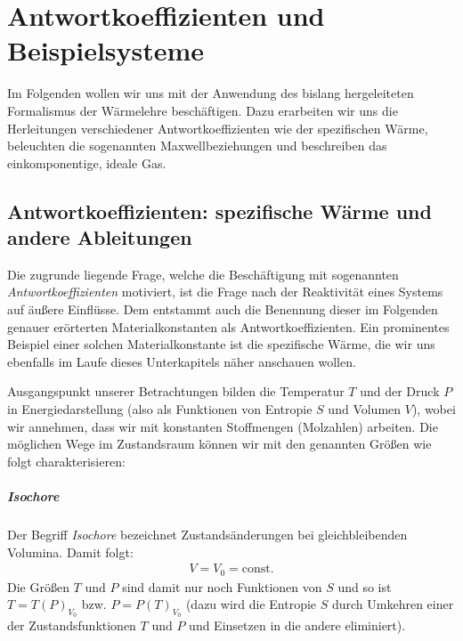 \chapter{Antwortkoeffizienten und Beispielsysteme}
Im Folgenden wollen wir uns mit der Anwendung des bislang hergeleiteten Formalismus der Wärmelehre beschäftigen. Dazu erarbeiten wir uns die Herleitungen verschiedener Antwortkoeffizienten wie der spezifischen Wärme, beleuchten die sogenannten Maxwellbeziehungen und beschreiben das einkomponentige, ideale Gas.
\section{Antwortkoeffizienten: spezifische Wärme und andere Ableitungen}
Die zugrunde liegende Frage, welche die Beschäftigung mit sogenannten \emph{Antwortkoeffizienten} motiviert, ist die Frage nach der Reaktivität eines Systems auf äußere Einflüsse. Dem entstammt auch die Benennung dieser \textendash{} im Folgenden genauer erörterten \textendash{} Materialkonstanten als Antwortkoeffizienten.
Ein prominentes Beispiel einer solchen Materialkonstante ist die spezifische Wärme, die wir uns ebenfalls im Laufe dieses Unterkapitels näher anschauen wollen.


Ausgangspunkt unserer Betrachtungen bilden die Temperatur $T$ und der Druck $P$ in Energiedarstellung (also als Funktionen von Entropie $S$ und Volumen $V$), wobei wir annehmen, dass wir mit konstanten Stoffmengen (Molzahlen) arbeiten.  Die möglichen Wege im Zustandsraum können wir mit den genannten Größen wie folgt charakterisieren:


\paragraph*{Isochore}
Der Begriff \emph{Isochore} bezeichnet Zustandsänderungen bei gleichbleibenden Volumina. Damit folgt:
\begin{align*}
    V=V_0=\mathrm{const}.
\end{align*}
Die Größen $T$ und $P$ sind damit nur noch Funktionen von $S$ und so ist $T=T(P)_{V_0}$ bzw. $P=P(T)_{V_0}$ (dazu wird die Entropie $S$ durch Umkehren einer der Zustandsfunktionen $T$ und $P$ und Einsetzen in die andere eliminiert).


